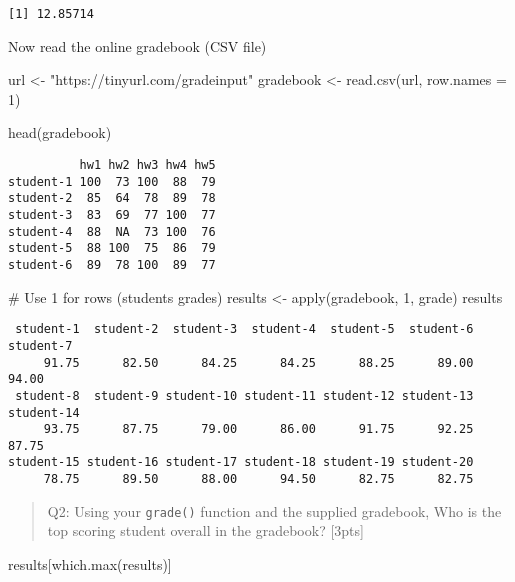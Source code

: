 \documentclass[
  letterpaper,
  DIV=11,
  numbers=noendperiod]{scrartcl}
\newenvironment{Shaded}{\begin{snugshade}}{\end{snugshade}}
\newcommand{\AttributeTok}[1]{\textcolor[rgb]{0.40,0.45,0.13}{#1}}
\newcommand{\CommentTok}[1]{\textcolor[rgb]{0.37,0.37,0.37}{#1}}
\newcommand{\DecValTok}[1]{\textcolor[rgb]{0.68,0.00,0.00}{#1}}
\newcommand{\FunctionTok}[1]{\textcolor[rgb]{0.28,0.35,0.67}{#1}}
\newcommand{\NormalTok}[1]{\textcolor[rgb]{0.00,0.23,0.31}{#1}}
\newcommand{\OtherTok}[1]{\textcolor[rgb]{0.00,0.23,0.31}{#1}}
\newcommand{\StringTok}[1]{\textcolor[rgb]{0.13,0.47,0.30}{#1}}
\begin{document}
\begin{verbatim}
[1] 12.85714
\end{verbatim}

Now read the online gradebook (CSV file)

\begin{Shaded}
\begin{Highlighting}[]
\NormalTok{url }\OtherTok{\textless{}{-}} \StringTok{"https://tinyurl.com/gradeinput"}
\NormalTok{gradebook }\OtherTok{\textless{}{-}} \FunctionTok{read.csv}\NormalTok{(url, }\AttributeTok{row.names =} \DecValTok{1}\NormalTok{)}

\FunctionTok{head}\NormalTok{(gradebook)}
\end{Highlighting}
\end{Shaded}

\begin{verbatim}
          hw1 hw2 hw3 hw4 hw5
student-1 100  73 100  88  79
student-2  85  64  78  89  78
student-3  83  69  77 100  77
student-4  88  NA  73 100  76
student-5  88 100  75  86  79
student-6  89  78 100  89  77
\end{verbatim}

\begin{Shaded}
\begin{Highlighting}[]
\CommentTok{\# Use 1 for rows (student\textquotesingle{}s grades)}
\NormalTok{results }\OtherTok{\textless{}{-}} \FunctionTok{apply}\NormalTok{(gradebook, }\DecValTok{1}\NormalTok{, grade)}
\NormalTok{results}
\end{Highlighting}
\end{Shaded}

\begin{verbatim}
 student-1  student-2  student-3  student-4  student-5  student-6  student-7 
     91.75      82.50      84.25      84.25      88.25      89.00      94.00 
 student-8  student-9 student-10 student-11 student-12 student-13 student-14 
     93.75      87.75      79.00      86.00      91.75      92.25      87.75 
student-15 student-16 student-17 student-18 student-19 student-20 
     78.75      89.50      88.00      94.50      82.75      82.75 
\end{verbatim}

\begin{quote}
Q2: Using your \texttt{grade()} function and the supplied gradebook, Who
is the top scoring student overall in the gradebook? {[}3pts{]}
\end{quote}

\begin{Shaded}
\begin{Highlighting}[]
\NormalTok{results[}\FunctionTok{which.max}\NormalTok{(results)]}
\end{Highlighting}
\end{Shaded}
\end{document}
